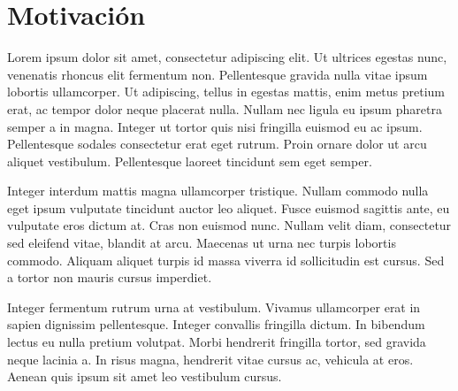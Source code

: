 
\section{Motivación}
\label{sec:Motivation}

%
%


Lorem ipsum dolor sit amet, consectetur adipiscing elit. Ut ultrices egestas nunc, venenatis rhoncus elit fermentum non. Pellentesque gravida nulla vitae ipsum lobortis ullamcorper. Ut adipiscing, tellus in egestas mattis, enim metus pretium erat, ac tempor dolor neque placerat nulla. Nullam nec ligula eu ipsum pharetra semper a in magna. Integer ut tortor quis nisi fringilla euismod eu ac ipsum. Pellentesque sodales consectetur erat eget rutrum. Proin ornare dolor ut arcu aliquet vestibulum. Pellentesque laoreet tincidunt sem eget semper.

Integer interdum mattis magna ullamcorper tristique. Nullam commodo nulla eget ipsum vulputate tincidunt auctor leo aliquet. Fusce euismod sagittis ante, eu vulputate eros dictum at. Cras non euismod nunc. Nullam velit diam, consectetur sed eleifend vitae, blandit at arcu. Maecenas ut urna nec turpis lobortis commodo. Aliquam aliquet turpis id massa viverra id sollicitudin est cursus. Sed a tortor non mauris cursus imperdiet.

Integer fermentum rutrum urna at vestibulum. Vivamus ullamcorper erat in sapien dignissim pellentesque. Integer convallis fringilla dictum. In bibendum lectus eu nulla pretium volutpat. Morbi hendrerit fringilla tortor, sed gravida neque lacinia a. In risus magna, hendrerit vitae cursus ac, vehicula at eros. Aenean quis ipsum sit amet leo vestibulum cursus.




